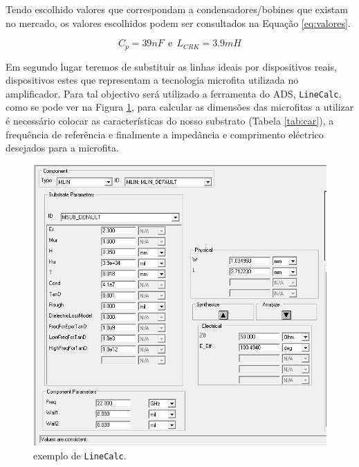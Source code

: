 \documentclass[11pt]{article}
\numberwithin{equation}{section}
\begin{document}
Tendo escolhido valores que correspondam a condensadores/bobines que existam no mercado, os valores escolhidos podem ser consultados na Equação \ref{eq:valores}.

\begin{equation}
C_{p} = 39 nF ~~ \text{e} ~~ L_{CRK} = 3.9 mH
\label{eq:valores}
\end{equation}



Em segundo lugar teremos de substituir as linhas ideais por dispositivos reais, dispositivos estes que representam a tecnologia microfita utilizada no amplificador. Para tal objectivo será utilizado a ferramenta do ADS, \texttt{LineCalc}, como se pode ver na Figura \ref{fig:LineCalc}, para calcular as dimensões das microfitas a utilizar é necessário colocar as características do nosso substrato (Tabela \ref{tab:car}), a frequência de referência e finalmente a impedância e comprimento eléctrico desejados para a microfita.

\begin{figure}[H]
	\centering
	\includegraphics[keepaspectratio=true, scale=0.45]{exps/LineCalc}
	\vspace{-0.5em}
	\caption{exemplo de \texttt{LineCalc}.}
	\vspace{-0.8em}
	\label{fig:LineCalc}
\end{figure}
\end{document}

